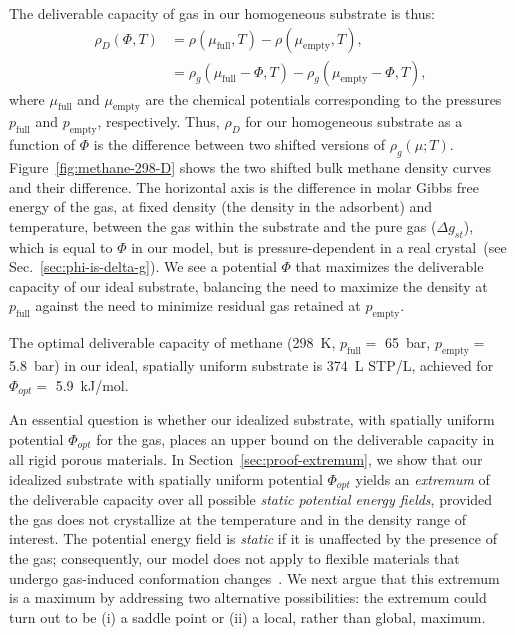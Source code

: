 \documentclass[twoside,twocolumn,9pt]{article}
\newcommand\V{\Phi}
\newcommand\pfull{\ensuremath{p_{\text{full}}}}
\newcommand\pempty{\ensuremath{p_{\text{empty}}}}
\newcommand\mufull{\ensuremath{\mu_{\text{full}}}}
\newcommand\muempty{\ensuremath{\mu_{\text{empty}}}}
\newcommand\gst{\ensuremath{\Delta g_{st}}}
\begin{document}
The deliverable capacity of gas in our homogeneous substrate is thus:
\begin{align}
    \rho_D(\V,T) &= \rho(\mufull,T) - \rho(\muempty,T),
    \label{eq:DofPhi}
    \\
    &= \rho_g(\mufull-\V,T) - \rho_g(\muempty-\V,T),
\end{align}
where $\mufull$ and $\muempty$ are the chemical potentials corresponding to the
pressures $\pfull$ and $\pempty$, respectively. Thus, $\rho_D$ for our
homogeneous substrate as a function of $\V$ is the difference between two
shifted versions of $\rho_g(\mu; T)$. Figure~\ref{fig:methane-298-D} shows the
two shifted bulk methane density curves and their difference. The horizontal
axis is the difference in molar Gibbs free energy of the gas, at fixed density (the density in the adsorbent) and temperature, between the gas within the substrate and the pure gas (\gst),
which is equal to $\V$ in our model, but is pressure-dependent in a real
crystal~(see Sec.~\ref{sec:phi-is-delta-g}). We see a potential $\V$ that
maximizes the deliverable capacity of our ideal substrate, balancing the need
to maximize the density at $\pfull$ against the need to minimize residual gas
retained at $\pempty$.

The optimal deliverable capacity of methane (298\ K, $\pfull=$ 65\ bar,
$\pempty=$ 5.8\ bar) in our ideal, spatially uniform substrate is 374\ L STP/L,
achieved for $\V_{opt} =$ 5.9\ kJ/mol.

An essential question is whether our idealized substrate, with spatially
uniform potential $\V_{opt}$ for the gas, places an upper bound on the
deliverable capacity in all rigid porous materials. In
Section~\ref{sec:proof-extremum}, we show that our idealized substrate with
spatially uniform potential $\V_{opt}$ yields an \emph{extremum} of the
deliverable capacity over all possible \emph{static potential energy fields},
provided the gas does not crystallize at the temperature and in the density
range of interest. The potential energy field is \emph{static} if it is
unaffected by the presence of the gas; consequently, our model does not apply
to flexible materials that undergo gas-induced conformation
changes~\cite{schneemann2014flexible}. We next argue that this extremum is a
maximum by addressing two alternative possibilities: the extremum could turn
out to be (i) a saddle point or (ii) a local, rather than global, maximum.
\end{document}
